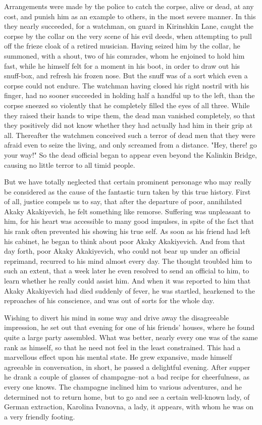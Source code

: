 Arrangements were made by the police to catch the corpse, alive or
dead, at any cost, and punish him as an example to others, in the most
severe manner. In this they nearly succeeded, for a watchman, on guard
in Kirinshkin Lane, caught the corpse by the collar on the very scene
of his evil deeds, when attempting to pull off the frieze cloak of a
retired musician. Having seized him by the collar, he summoned, with a
shout, two of his comrades, whom he enjoined to hold him fast, while
he himself felt for a moment in his boot, in order to draw out his
snuff-box, and refresh his frozen nose. But the snuff was of a sort
which even a corpse could not endure. The watchman having closed his
right nostril with his finger, had no sooner succeeded in holding half
a handful up to the left, than the corpse sneezed so violently that he
completely filled the eyes of all three. While they raised their hands
to wipe them, the dead man vanished completely, so that they
positively did not know whether they had actually had him in their
grip at all. Thereafter the watchmen conceived such a terror of dead
men that they were afraid even to seize the living, and only screamed
from a distance. "Hey, there! go your way!" So the dead official began
to appear even beyond the Kalinkin Bridge, causing no little terror to
all timid people.

But we have totally neglected that certain prominent personage who may
really be considered as the cause of the fantastic turn taken by this
true history. First of all, justice compels us to say, that after the
departure of poor, annihilated Akaky Akakiyevich, he felt something
like remorse. Suffering was unpleasant to him, for his heart was
accessible to many good impulses, in spite of the fact that his rank
often prevented his showing his true self. As soon as his friend had
left his cabinet, he began to think about poor Akaky Akakiyevich. And
from that day forth, poor Akaky Akakiyevich, who could not bear up
under an official reprimand, recurred to his mind almost every day.
The thought troubled him to such an extent, that a week later he even
resolved to send an official to him, to learn whether he really could
assist him. And when it was reported to him that Akaky Akakiyevich had
died suddenly of fever, he was startled, hearkened to the reproaches
of his conscience, and was out of sorts for the whole day.

Wishing to divert his mind in some way and drive away the disagreeable
impression, he set out that evening for one of his friends' houses,
where he found quite a large party assembled. What was better, nearly
every one was of the same rank as himself, so that he need not feel in
the least constrained. This had a marvellous effect upon his mental
state. He grew expansive, made himself agreeable in conversation, in
short, he passed a delightful evening. After supper he drank a couple
of glasses of champagne--not a bad recipe for cheerfulness, as every
one knows. The champagne inclined him to various adventures, and he
determined not to return home, but to go and see a certain well-known
lady, of German extraction, Karolina Ivanovna, a lady, it appears,
with whom he was on a very friendly footing.

